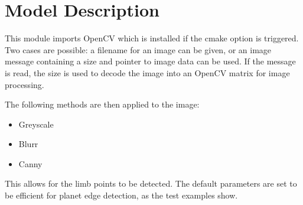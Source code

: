 
\section{Model Description}

This module imports OpenCV which is installed if the cmake option is triggered. Two cases are possible: a filename for an image can be given, or an image message containing a size and pointer to image data can be used. If the message is read, the size is used to decode the image into an OpenCV matrix for image processing.

The following methods are then applied to the image:
\begin{itemize}
\item Greyscale
\item Blurr
\item Canny
\end{itemize}

This allows for the limb points to be detected. The default parameters are set to be efficient for planet edge detection, as the test examples show. 

